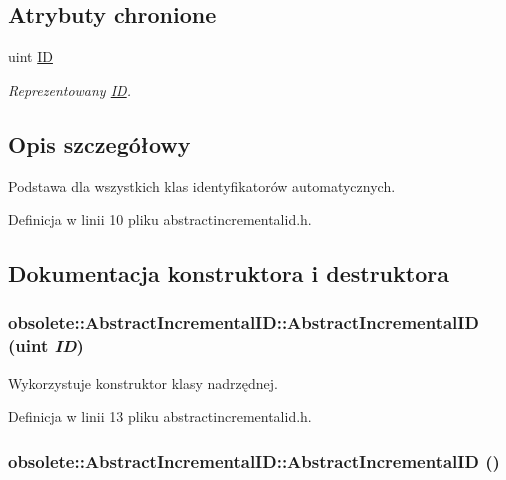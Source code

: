\subsection*{Atrybuty chronione}
\begin{DoxyCompactItemize}
\item 
uint \hyperlink{classobsolete_1_1AbstractID_a5f67fa1c7d96085f0ef41193b60b570c}{ID}
\begin{DoxyCompactList}\small\item\em Reprezentowany \hyperlink{classobsolete_1_1ID}{ID}. \item\end{DoxyCompactList}\end{DoxyCompactItemize}


\subsection{Opis szczegółowy}
Podstawa dla wszystkich klas identyfikatorów automatycznych. 

Definicja w linii 10 pliku abstractincrementalid.h.



\subsection{Dokumentacja konstruktora i destruktora}
\hypertarget{classobsolete_1_1AbstractIncrementalID_a7977c3993208ff1ff91b36bbc7aed925}{
\subsubsection[{AbstractIncrementalID}]{\setlength{\rightskip}{0pt plus 5cm}obsolete::AbstractIncrementalID::AbstractIncrementalID (uint {\em ID})}}
\label{classobsolete_1_1AbstractIncrementalID_a7977c3993208ff1ff91b36bbc7aed925}


Wykorzystuje konstruktor klasy nadrzędnej. 



Definicja w linii 13 pliku abstractincrementalid.h.

\hypertarget{classobsolete_1_1AbstractIncrementalID_a6f379264ad7fa66c1a4be8d14214497b}{
\subsubsection[{AbstractIncrementalID}]{\setlength{\rightskip}{0pt plus 5cm}obsolete::AbstractIncrementalID::AbstractIncrementalID ()}}
\label{classobsolete_1_1AbstractIncrementalID_a6f379264ad7fa66c1a4be8d14214497b}


